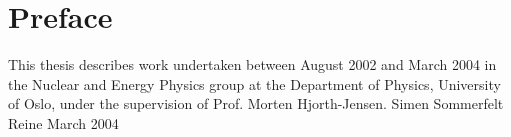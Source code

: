 \chapter*{Preface}

This thesis describes work undertaken between August 2002 and
March 2004 in the Nuclear and Energy Physics group at the Department
of Physics, University of Oslo, under the supervision of Prof. Morten
Hjorth-Jensen.
\newline
%
\newline
%
\newline
\phantom{AAAAAAAAAAAAAAAAAAAAAAAAAAAAAAAAAAAAA} Simen Sommerfelt Reine \newline
\phantom{AAAAAAAAAAAAAAAAAAAAAAAAAAAAAAAAAAAAA Simen Somi} March 2004



